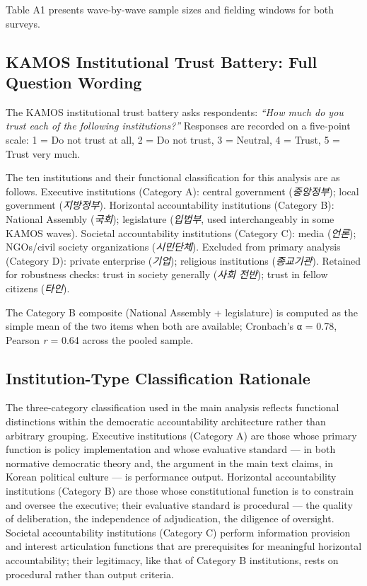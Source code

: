 \documentclass[
  12pt,
  letterpaper]{article}
\begin{document}
Table A1 presents wave-by-wave sample sizes and fielding windows for
both surveys.

\subsection{KAMOS Institutional Trust Battery: Full Question
Wording}\label{sec-question-wording}

The KAMOS institutional trust battery asks respondents: \emph{``How much
do you trust each of the following institutions?''} Responses are
recorded on a five-point scale: 1 = Do not trust at all, 2 = Do not
trust, 3 = Neutral, 4 = Trust, 5 = Trust very much.

The ten institutions and their functional classification for this
analysis are as follows. Executive institutions (Category A): central
government (\emph{중앙정부}); local government (\emph{지방정부}).
Horizontal accountability institutions (Category B): National Assembly
(\emph{국회}); legislature (\emph{입법부}, used interchangeably in some
KAMOS waves). Societal accountability institutions (Category C): media
(\emph{언론}); NGOs/civil society organizations (\emph{시민단체}).
Excluded from primary analysis (Category D): private enterprise
(\emph{기업}); religious institutions (\emph{종교기관}). Retained for
robustness checks: trust in society generally (\emph{사회 전반}); trust
in fellow citizens (\emph{타인}).

The Category B composite (National Assembly + legislature) is computed
as the simple mean of the two items when both are available; Cronbach's
α = 0.78, Pearson \emph{r} = 0.64 across the pooled sample.

\subsection{Institution-Type Classification
Rationale}\label{sec-classification}

The three-category classification used in the main analysis reflects
functional distinctions within the democratic accountability
architecture rather than arbitrary grouping. Executive institutions
(Category A) are those whose primary function is policy implementation
and whose evaluative standard --- in both normative democratic theory
and, the argument in the main text claims, in Korean political culture
--- is performance output. Horizontal accountability institutions
(Category B) are those whose constitutional function is to constrain and
oversee the executive; their evaluative standard is procedural --- the
quality of deliberation, the independence of adjudication, the diligence
of oversight. Societal accountability institutions (Category C) perform
information provision and interest articulation functions that are
prerequisites for meaningful horizontal accountability; their
legitimacy, like that of Category B institutions, rests on procedural
rather than output criteria.
\end{document}
